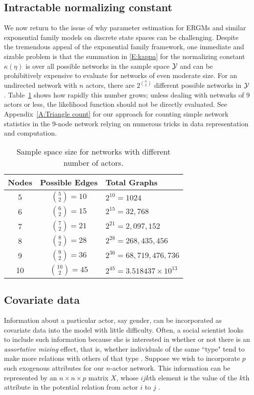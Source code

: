 \subsection{Intractable normalizing constant} \label{S:intractable}
We now return to the issue of why parameter estimation for ERGMs and 
similar exponential family models on discrete state spaces can be challenging.
Despite the tremendous appeal of the exponential family framework, one 
immediate and sizable problem is that the summation in \eqref{E:kappa} for the 
normalizing constant $\kappa(\eta)$ is over all possible 
networks in the sample space ${\mathcal Y}$ and can be prohibitively expensive to 
evaluate for networks of even moderate size.
For an undirected network with $n$ actors, there are $2^{{n\choose 2} }$ 
different possible networks in ${\mathcal Y}$.  Table~\ref{T:number graphs} shows how rapidly this number grows; 
unless dealing with networks of 9 actors or less, the likelihood function 
should not be directly evaluated.  See Appendix~\ref{A:Triangle count}
for our approach for counting simple network statistics in the 9-node network
relying on numerous tricks in data representation and computation.

\begin{table}[h] 
\caption{Sample space size for networks with different number of actors.}
\begin{tabular}{ccl} 
\hline 
Nodes & Possible Edges & Total Graphs \\ [1ex]
\hline
5 & ${5 \choose 2} = 10$ & $2^{10} = 1024$ \\ [1ex]
6 & ${6 \choose 2} = 15$ & $2^{15} = 32,768$ \\ [1ex]
7 & ${7 \choose 2} = 21$ & $2^{21} = 2,097,152$ \\ [1ex]
8 & ${8 \choose 2} = 28$ & $2^{28} = 268,435,456$ \\ [1ex]
9 & ${9 \choose 2} = 36$ & $2^{36} = 68,719,476,736$ \\ [1ex]
10 & ${10 \choose 2} = 45$ & $2^{45} = 3.518437\times10^{13}$ \\ [1ex]
\hline 
\end{tabular} \label{T:number graphs}
\end{table}

\subsection{Covariate data} \label{S:Covariate}
Information about a particular actor, say gender, can be incorporated as 
covariate data into the model with little difficulty.
Often, a social scientist looks to include such information because she is interested in
whether or not there is an \emph{assortative mixing} effect, that is, whether individuals of the same ``type" tend to make more relations with others of that type \citep{Goodreau:2009}.  
Suppose we wish to incorporate $p$ such exogenous attributes for our $n$-actor network.  
This information can be represented by an $n \times n \times p$ matrix $X$, whose 
$ijk$th element is the value of the $k$th attribute in the potential relation from actor
$i$ to $j$ \citep*{Fienberg:1981,ergm}.  

